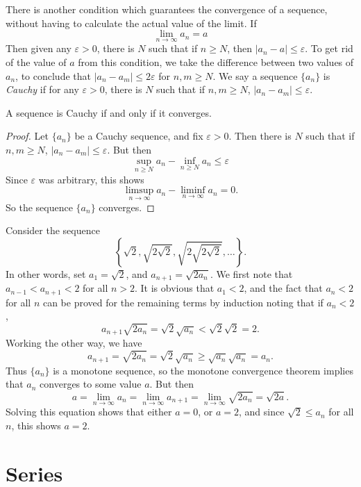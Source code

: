 There is another condition which guarantees the convergence of a sequence, without having to calculate the actual value of the limit. If
%
\[ \lim_{n \to \infty} a_n = a \]
%
Then given any $\varepsilon > 0$, there is $N$ such that if $n \geq N$, then $|a_n - a| \leq \varepsilon$. To get rid of the value of $a$ from this condition, we take the difference between two values of $a_n$, to conclude that $|a_n - a_m| \leq 2\varepsilon$ for $n,m \geq N$. We say a sequence $\{ a_n \}$ is \emph{Cauchy} if for any $\varepsilon > 0$, there is $N$ such that if $n,m \geq N$, $|a_n - a_m| \leq \varepsilon$.

\begin{theorem}
    A sequence is Cauchy if and only if it converges.
\end{theorem}
\begin{proof}
    Let $\{ a_n \}$ be a Cauchy sequence, and fix $\varepsilon > 0$. Then there is $N$ such that if $n,m \geq N$, $|a_n - a_m| \leq \varepsilon$. But then
    \[ \sup_{n \geq N} a_n - \inf_{n \geq N} a_n \leq \varepsilon \]
    Since $\varepsilon$ was arbitrary, this shows
    \[ \limsup_{n \to \infty} a_n - \liminf_{n \to \infty} a_n = 0. \]
    So the sequence $\{ a_n \}$ converges.
\end{proof}

\begin{example}
    Consider the sequence
    \[ \left\{ \sqrt{2}, \sqrt{2\sqrt{2}}, \sqrt{2\sqrt{2\sqrt{2}}}, \dots \right\}. \]
    In other words, set $a_1 = \sqrt{2}$, and $a_{n+1} = \sqrt{2a_n}$. We first note that $a_{n-1} < a_{n+1} < 2$ for all $n > 2$. It is obvious that $a_1 < 2$, and the fact that $a_n < 2$ for all $n$ can be proved for the remaining terms by induction noting that if $a_n < 2$,
    \[ a_{n+1} \sqrt{2a_n} = \sqrt{2} \sqrt{a_n} < \sqrt{2} \sqrt{2} = 2. \]
    Working the other way, we have
    \[ a_{n+1} = \sqrt{2a_n} = \sqrt{2} \sqrt{a_n} \geq \sqrt{a_n} \sqrt{a_n} = a_n. \]
    Thus $\{ a_n \}$ is a monotone sequence, so the monotone convergence theorem implies that $a_n$ converges to some value $a$. But then
    \[ a = \lim_{n \to \infty} a_n = \lim_{n \to \infty} a_{n+1} = \lim_{n \to \infty} \sqrt{2a_n} = \sqrt{2a}. \]
    Solving this equation shows that either $a = 0$, or $a = 2$, and since $\sqrt{2} \leq a_n$ for all $n$, this shows $a = 2$.
\end{example}



\section{Series}

